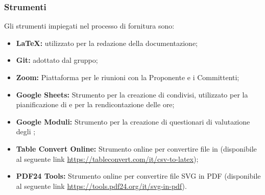 \subsubsection{Strumenti}
Gli strumenti impiegati nel processo di fornitura sono:
\begin{itemize}
  \item \textbf{LaTeX:}  utilizzato per la redazione della documentazione;
  \item \textbf{Git:}  adottato dal gruppo;
  \item \textbf{Zoom:} Piattaforma per le riunioni con la Proponente e i Committenti;
  \item \textbf{Google Sheets:} Strumento per la creazione di  condivisi, utilizzato per la pianificazione di  e per la rendicontazione delle ore;
  \item \textbf{Google Moduli:} Strumento per la creazione di questionari di valutazione degli ;
  \item \textbf{Table Convert Online:} Strumento online per convertire file  in  (disponibile al seguente link \href{https://tableconvert.com/it/csv-to-latex}{https://tableconvert.com/it/csv-to-latex});
  \item \textbf{PDF24 Tools:} Strumento online per convertire file SVG in PDF (disponibile al seguente link \href{https://tools.pdf24.org/it/svg-in-pdf}{https://tools.pdf24.org/it/svg-in-pdf}).
\end{itemize}

